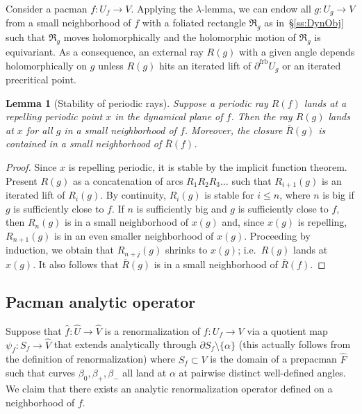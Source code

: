 \documentclass[]{amsart}
\newcommand{\Rect}{{\mathfrak R }}
\newcommand\frb{{\operatorname{frb}}}
\newtheorem{lem}[thm]{Lemma}
\theoremstyle{remark}
\numberwithin{equation}{section}
\theoremstyle{definition}
\begin{document}
Consider a pacman $f\colon U_f\to V$. Applying the $\lambda$-lemma, we can endow all $g\colon U_g\to V$ from a small neighborhood of $f$ with a foliated rectangle $\Rect_g$ as in~\S\ref{ss:DynObj} such that $\Rect_g$ moves holomorphically and the holomorphic motion of $\Rect_g$ is equivariant. As a consequence, an external ray $R(g)$ with a given angle depends holomorphically on $g$ unless $R(g)$ hits an iterated lift of $\partial ^\frb U_g$ or an iterated precritical point.

\begin{lem}[Stability of periodic rays]
\label{lem:PerRaysStable}
Suppose a periodic ray $R(f)$ lands at a repelling periodic point $x$ in the dynamical plane of $f$. Then the ray $R(g)$ lands at $x$  for all $g$ in a small neighborhood of $f$. Moreover, the closure $\overline R(g)$ is contained in a small neighborhood of $\overline R(f)$.
\end{lem}
\begin{proof}
Since $x$ is repelling periodic, it is stable by the implicit function theorem. Present $R(g)$ as a concatenation of arcs $R_1 R_2 R_3\dots$ such that $R_{i+1}(g)$ is an iterated lift of $R_i(g)$. By continuity, $R_i(g)$ is stable for $i\le n$, where $n$ is big if $g$ is sufficiently close to $f$. If $n$ is sufficiently big and $g$ is sufficiently close to $f$, then $R_{n}(g)$ is in a small neighborhood of $x(g)$ and, since $x(g)$ is repelling, $R_{n+1}(g)$ is in an even smaller neighborhood of $x(g)$. Proceeding by induction, we obtain that $R_{n+j}(g)$ shrinks to $x(g)$; i.e.~$R(g)$ lands at $x(g)$. It also follows that $\overline R(g)$ is in a small neighborhood of $\overline R(f)$.
\end{proof}


\subsection{Pacman analytic operator}
\label{ss:Pacm}

Suppose that $\hat f:\widehat U\to  \widehat V $ is a renormalization of $f:U_f\to   V $ via a quotient map  $\psi_f:   S_f\to \widehat V$ that extends analytically through $\partial   S_f\setminus \{\alpha\}$ (this actually follows from the definition of renormalization) where $  S_f\subset V$ is the domain of a prepacman $\widehat F$ such that curves $\beta_0, \beta_+, \beta_-$ all land at $\alpha$ at pairwise distinct well-defined  angles. We claim that there exists an analytic renormalization operator defined on a neighborhood of $f$.
\end{document}
